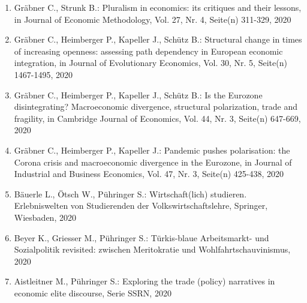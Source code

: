 \begin{enumerate}
	 \item Gräbner C., Strunk B.: Pluralism in economics: its critiques and their lessons, in Journal of Economic Methodology, Vol. 27, Nr. 4, Seite(n) 311-329, 2020
	 \item Gräbner C., Heimberger P., Kapeller J., Schütz B.: Structural change in times of increasing openness: assessing path dependency in European economic integration, in Journal of Evolutionary Economics, Vol. 30, Nr. 5, Seite(n) 1467-1495, 2020
	 \item Gräbner C., Heimberger P., Kapeller J., Schütz B.: Is the Eurozone disintegrating? Macroeconomic divergence, structural polarization, trade and fragility, in Cambridge Journal of Economics, Vol. 44, Nr. 3, Seite(n) 647-669, 2020
	 \item Gräbner C., Heimberger P., Kapeller J.: Pandemic pushes polarisation: the Corona crisis and macroeconomic divergence in the Eurozone, in Journal of Industrial and Business Economics, Vol. 47, Nr. 3, Seite(n) 425-438, 2020
	 \item Bäuerle L., Ötsch W., Pühringer S.: Wirtschaft(lich) studieren. Erlebniswelten von Studierenden der Volkswirtschaftslehre, Springer, Wiesbaden, 2020
	 \item Beyer K., Griesser M., Pühringer S.: Türkis-blaue Arbeitsmarkt- und Sozialpolitik revisited: zwischen Meritokratie und Wohlfahrtschauvinismus, 2020
	 \item Aistleitner M., Pühringer S.: Exploring the trade (policy) narratives in economic elite discourse, Serie SSRN, 2020
\end{enumerate}
